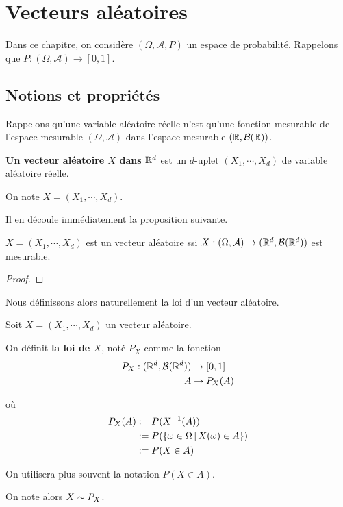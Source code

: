 \chapter{Vecteurs aléatoires}

\label{chapter:vecteurs_aleatoires}

Dans ce chapitre, on considère $(\Omega, \mathcal{A}, P)$ un espace de
probabilité.
Rappelons que $P : (\Omega, \mathcal{A}) \rightarrow [0, 1]$.

\section{Notions et propriétés}

Rappelons qu'une variable aléatoire réelle n'est qu'une fonction mesurable de
l'espace mesurable $(\Omega, \mathcal{A})$ dans l'espace mesurable $(\mathbb{R},
\mathcal{B}(\mathbb{R}))$.

\begin{definition}
	\textbf{Un vecteur aléatoire $X$ dans $\mathbb{R}^{d}$} est un $d$-uplet $(X_{1}, \cdots,
	X_{d})$ de variable aléatoire réelle.

	On note $X = (X_{1}, \cdots, X_{d})$.
\end{definition}

Il en découle immédiatement la proposition suivante.

\begin{proposition}
	$X = (X_{1}, \cdots, X_{d})$ est un vecteur aléatoire ssi $X : (\Omega,
	\mathcal{A}) \rightarrow (\mathbb{R}^{d}, \mathcal{B}(\mathbb{R}^{d}))$ est mesurable.
\end{proposition}

\ifdefined\outputproof
\begin{proof}

\end{proof}
\fi

Nous définissons alors naturellement la loi d'un vecteur aléatoire.

\begin{definition}
	Soit $X = (X_{1}, \cdots, X_{d})$ un vecteur aléatoire.

	On définit \textbf{la loi de $X$}, noté $P_{X}$ comme la fonction
	\begin{align}
		P_{X} : (\mathbb{R}^{d}, \mathcal{B}(\mathbb{R}^{d})) &\rightarrow [0, 1] \\
		A &\rightarrow P_{X}(A)
	\end{align}

	où
	\begin{align}
		P_{X}(A) & := P(X^{-1}(A)) \\
		&:= P(\left\{\omega \in \Omega \, | \, X(\omega) \in A \right\}) \\
		& := P(X \in A)
	\end{align}

	On utilisera plus souvent la notation $P(X \in A)$.

	On note alors $X \sim P_{X}$.
\end{definition}

